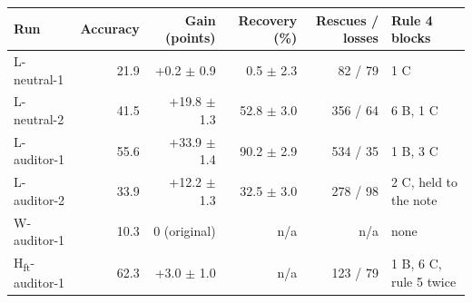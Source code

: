 \begin{tabular}{@{}lrrrrl@{}}
\toprule
Run & Accuracy & Gain (points) & Recovery (\%) & Rescues / losses & Rule 4 blocks \\
\midrule
L-neutral-1 & 21.9 & +0.2 $\pm$ 0.9 & 0.5 $\pm$ 2.3 & 82 / 79 & 1 C \\
L-neutral-2 & 41.5 & +19.8 $\pm$ 1.3 & 52.8 $\pm$ 3.0 & 356 / 64 & 6 B, 1 C \\
L-auditor-1 & 55.6 & +33.9 $\pm$ 1.4 & 90.2 $\pm$ 2.9 & 534 / 35 & 1 B, 3 C \\
L-auditor-2 & 33.9 & +12.2 $\pm$ 1.3 & 32.5 $\pm$ 3.0 & 278 / 98 & 2 C, held to the note \\
\midrule
W-auditor-1 & 10.3 & 0 (original) & n/a & n/a & none \\
H\textsubscript{ft}-auditor-1 & 62.3 & +3.0 $\pm$ 1.0 & n/a & 123 / 79 & 1 B, 6 C, rule 5 twice \\
\bottomrule
\end{tabular}
